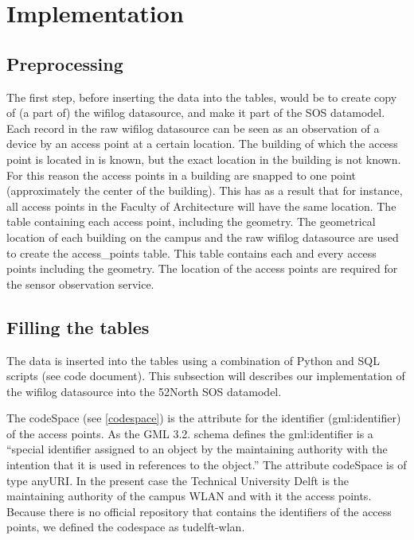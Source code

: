\chapter{Implementation}

\section{Preprocessing}
The first step, before inserting the data into the tables, would be to create 
copy of (a part of) the wifilog datasource, and make it part of the SOS datamodel.
Each record in the raw wifilog datasource can be seen as an observation of a device 
by an access point at a certain location. The building of which the access point is 
located in is known, but the exact location in the building is not known. For this 
reason the access points in a building are snapped to one point (approximately the 
center of the building). This has as a result that for instance, all access points 
in the Faculty of Architecture will have the same location. The table containing each 
access point, including the geometry. The geometrical location of each building on the 
campus and the raw wifilog datasource are used to create the access\_points table. 
This table contains each and every access points including the geometry. The location 
of the access points are required for the sensor observation service. 


\section{Filling the tables}
The data is inserted into the tables using a combination of Python and SQL scripts 
(see code document). This subsection will describes our implementation of the wifilog 
datasource into the 52North SOS datamodel. %

The codeSpace (see \autoref{codespace}) is the attribute for the identifier (gml:identifier) of the access points. As the GML 3.2. schema defines the gml:identifier is a “special identifier assigned to an object by the maintaining authority with the intention that it is used in references to the object.” The attribute codeSpace is of type anyURI. In the present case the Technical University Delft is the maintaining authority of the campus WLAN and with it the access points. Because there is no official repository that contains the identifiers of the access points, we defined the codespace as tudelft-wlan.

